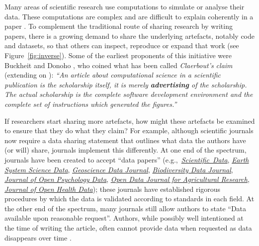 \documentclass[12pt]{article}
\begin{document}
Many areas of scientific research use computations to simulate or analyse their data. These computations are complex and are difficult to explain coherently in a paper \citep{marwick_how_2015}.
To complement the traditional route of sharing research by writing papers,
there is a growing demand to share the underlying artefacts, notably 
code and datasets, so that others can inspect, reproduce or expand that work
(see Figure~\ref{fig:inverse}).
Some of the earliest proponents of this initiative were Buckheit and Donoho \cite{buckheit_wavelab_1995}, who coined what has been called \emph{Claerbout's claim} (extending on \citet{claerbout_electronic_1992}):
\emph{``An article about computational science in a scientific publication 
is  the scholarship itself, it is merely \textbf{advertising} of
the scholarship. The actual scholarship is the complete software development
environment and the complete set of instructions which generated the 
figures.''}

If researchers start sharing more artefacts, how might these artefacts be examined to ensure that they do what they claim?
For example,
although  scientific journals now require a data sharing statement that
outlines what data the authors have (or will) share, journals  implement this differently.
At one end of the spectrum, journals have been created to accept ``data papers''
(e.g.,~\href{https://www.nature.com/sdata/}{\emph{Scientific~Data}}, 
\href{https://essd.copernicus.org/}{\emph{Earth System Science Data}}, 
\href{https://rmets.onlinelibrary.wiley.com/journal/20496060}{\emph{Geoscience Data Journal}},
\href{https://bdj.pensoft.net/}{\emph{Biodiversity Data Journal}},
\href{https://openpsychologydata.metajnl.com/}{\emph{Journal of Open Psychology Data}},
\href{https://odjar.org/}{\emph{Open Data Journal for Agricultural Research}},
\href{https://openhealthdata.metajnl.com}{\emph{Journal of Open Health Data}});
these journals have established rigorous procedures by which
the data is validated according to standards in each field.
At the other end of the spectrum, many journals still allow authors to state ``Data available upon reasonable request''.
Authors, while possibly well intentioned at the time of writing the article, often cannot provide data when requested as data disappears over time \cite{Vines2014-hf}.
\end{document}
